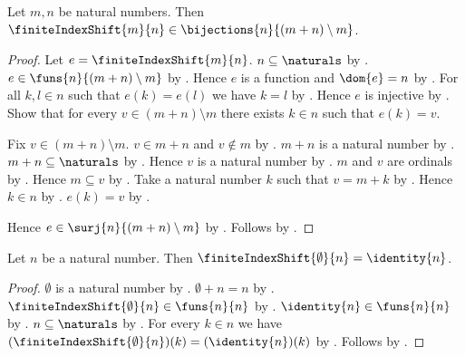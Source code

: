 \begin{theorem}\label{finite_index_shift_bijection}
    Let $m,n$ be natural numbers.
    Then $\finiteIndexShift{m}{n}\in\bijections{n}{(m+n)\setminus m}$.
\end{theorem}
\begin{proof}
    Let $e=\finiteIndexShift{m}{n}$.
    $n\subseteq\naturals$ by .
    $e\in\funs{n}{(m+n)\setminus m}$ by .
    Hence $e$ is a function and $\dom{e}=n$ by .
    For all $k,l\in n$ such that $e(k)=e(l)$ we have $k=l$ by
        .
    Hence $e$ is injective by .
    Show that for every $v\in(m+n)\setminus m$ there exists $k\in n$ such that $e(k)=v$.
    \begin{subproof}
        Fix $v\in(m+n)\setminus m$.
        $v\in m+n$ and $v\notin m$ by .
        $m+n$ is a natural number by .
        $m+n\subseteq\naturals$ by .
        Hence $v$ is a natural number by .
        $m$ and $v$ are ordinals by .
        Hence $m\subseteq v$ by .
        Take a natural number $k$ such that $v=m+k$ by .
        Hence $k\in n$ by .
        $e(k)=v$ by .
    \end{subproof}
    Hence $e\in\surj{n}{(m+n)\setminus m}$ by .
    Follows by .
\end{proof}

\begin{proposition}\label{finite_index_shift_zero}
    Let $n$ be a natural number.
    Then $\finiteIndexShift{\emptyset}{n}=\identity{n}$.
\end{proposition}
\begin{proof}
    $\emptyset$ is a natural number by .
    $\emptyset+n=n$ by .
    $\finiteIndexShift{\emptyset}{n}\in\funs{n}{n}$ by
        .
    $\identity{n}\in\funs{n}{n}$ by .
    $n\subseteq\naturals$ by .
    For every $k\in n$ we have $(\finiteIndexShift{\emptyset}{n})(k)=(\identity{n})(k)$ by
        .
    Follows by .
\end{proof}


